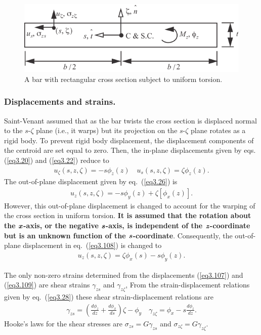 \documentclass{AeroStructure-ERJohnson}
\begin{document}
{\def\thefigure{3.14}
\begin{figure}[!t]
\centerline{\includegraphics{Figure_3-14.pdf}}
\caption{A bar with rectangular cross section subject to uniform torsion.}\label{fig3.14}
\end{figure}}


\subsubsection{Displacements and strains.} Saint-Venant assumed that as the bar twists the cross section is displaced normal to the $s$-$\zeta$ plane (i.e., it warps) but its projection on the $s$-$\zeta$ plane rotates as a rigid body. To prevent rigid body displacement, the displacement components of the centroid are set equal to zero. Then, the in-plane displacements given by eqs. (\ref{eq3.20}) and (\ref{eq3.22}) reduce to
\begin{align}\label{eq3.107}
u_{\zeta}(s, z, \zeta)=-s \phi_{z}(z) \quad u_{s}(s, z, \zeta)=\zeta \phi_{z}(z).
\end{align}
The out-of-plane displacement given by eq.~(\ref{eq3.26}) is
\begin{align}\label{eq3.108}
u_{z}(s, z, \zeta)=-s \phi_{y}(z)+\zeta\left[\phi_{x}(z)\right].
\end{align}
However, this out-of-plane displacement is changed to account for the warping of the cross section in uniform torsion. \textbf{It is assumed that the rotation about the $\textbf{\textit{x}}$-axis, or the negative $\textbf{\textit{s}}$-axis, is independent of the $\textbf{\textit{z}}$-coordinate but is an unknown function of the $\textbf{\textit{s}}$-coordinate}. Consequently, the out-of-plane displacement in eq.~(\ref{eq3.108}) is changed to
\begin{align}\label{eq3.109}
u_{z}(s, z, \zeta)=\zeta \phi_{x}(s)-s \phi_{y}(z).
\end{align}

\vspace*{-1pc}

The only non-zero strains determined from the displacements (\ref{eq3.107}) and (\ref{eq3.109}) are shear strains $\gamma_{z s}$ and $\gamma_{z \zeta}$, From the strain-displacement relations given by eq.~(\ref{eq3.28}) these shear strain-displacement relations are
\begin{align}\label{eq3.110}
\gamma_{z s}=\left(\frac{d \phi_{z}}{d z}+\frac{d \phi_{x}}{d s}\right) \zeta-\phi_{y} \quad \gamma_{z \zeta}=\phi_{x}-s \frac{d \phi_{z}}{d z}.
\end{align}
Hooke's laws for the shear stresses are $\sigma_{z s}=G \gamma_{z s}$ and $\sigma_{z \zeta}=G \gamma_{z \zeta}$.
\end{document}
